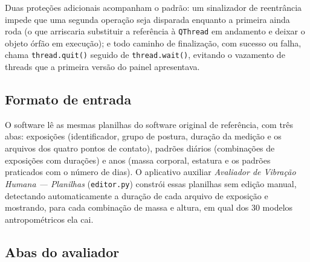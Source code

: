 \documentclass[11pt,a4paper]{article}
\newcommand{\code}[1]{\texttt{\small #1}}
\begin{document}
Duas proteções adicionais acompanham o padrão: um sinalizador de reentrância
impede que uma segunda operação seja disparada enquanto a primeira ainda roda
(o que arriscaria substituir a referência à \code{QThread} em andamento e deixar
o objeto órfão em execução); e todo caminho de finalização, com sucesso ou
falha, chama \code{thread.quit()} seguido de \code{thread.wait()}, evitando o
vazamento de threads que a primeira versão do painel apresentava.

\subsection{Formato de entrada}

O software lê as mesmas planilhas do software original de referência, com três
abas: exposições (identificador, grupo de postura, duração da medição e os
arquivos dos quatro pontos de contato), padrões diários (combinações de
exposições com durações) e anos (massa corporal, estatura e os padrões
praticados com o número de dias). O aplicativo auxiliar \emph{Avaliador de
Vibração Humana --- Planilhas} (\code{editor.py}) constrói essas planilhas sem
edição manual, detectando automaticamente a duração de cada arquivo de
exposição e mostrando, para cada combinação de massa e altura, em qual dos 30
modelos antropométricos ela cai.

\subsection{Abas do avaliador}
\end{document}
